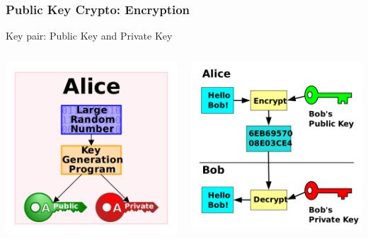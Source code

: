 \begin{frame}
    \frametitle{Public Key Crypto: Encryption}
    Key pair: Public Key and Private Key
    \begin{columns}
        \begin{column}{0.35\textwidth}
            \begin{center}
                \includegraphics[scale=0.1]{./figures/Public-key-crypto.png}
            \end{center}
        \end{column}
        \begin{column}{0.65\textwidth}
            \begin{center}
                \includegraphics[scale=0.1]{./figures/Public_key_shared_secret.png}

\end{center}
\end{column}
\end{columns}
\end{frame}
